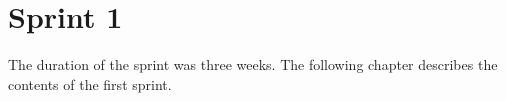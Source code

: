 \chapter{Sprint 1}

The duration of the sprint was three weeks. The following chapter describes the contents of the first sprint.